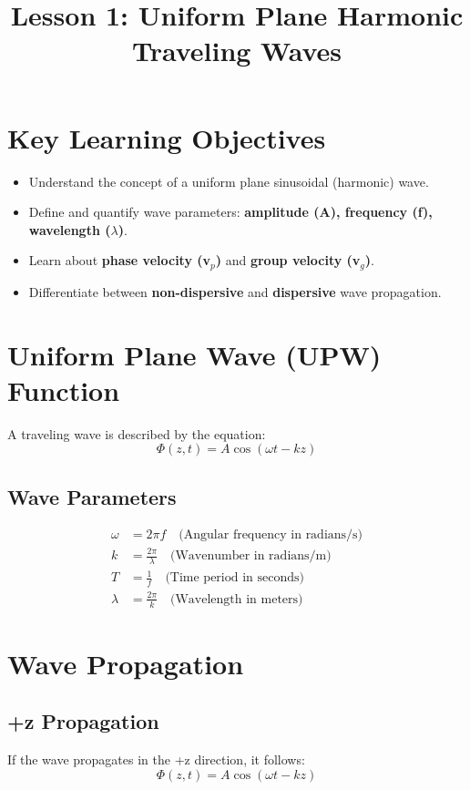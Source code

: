 \documentclass{article}
\title{Lesson 1: Uniform Plane Harmonic Traveling Waves}
\author{}
\date{}
\begin{document}
\maketitle

\section{Key Learning Objectives}
\begin{itemize}
    \item Understand the concept of a uniform plane sinusoidal (harmonic) wave.
    \item Define and quantify wave parameters: \textbf{amplitude (A), frequency (f), wavelength ($\lambda$)}.
    \item Learn about \textbf{phase velocity (v$_p$)} and \textbf{group velocity (v$_g$)}.
    \item Differentiate between \textbf{non-dispersive} and \textbf{dispersive} wave propagation.
\end{itemize}

\section{Uniform Plane Wave (UPW) Function}
A traveling wave is described by the equation:
\begin{equation}
    \Phi(z,t) = A \cos(\omega t - k z)
\end{equation}

\subsection{Wave Parameters}
\begin{align}
    \omega &= 2\pi f \quad \text{(Angular frequency in radians/s)} \\
    k &= \frac{2\pi}{\lambda} \quad \text{(Wavenumber in radians/m)} \\
    T &= \frac{1}{f} \quad \text{(Time period in seconds)} \\
    \lambda &= \frac{2\pi}{k} \quad \text{(Wavelength in meters)}
\end{align}

\section{Wave Propagation}
\subsection{+z Propagation}
If the wave propagates in the +z direction, it follows:
\begin{equation}
    \Phi(z,t) = A \cos(\omega t - k z)
\end{equation}
\end{document}
